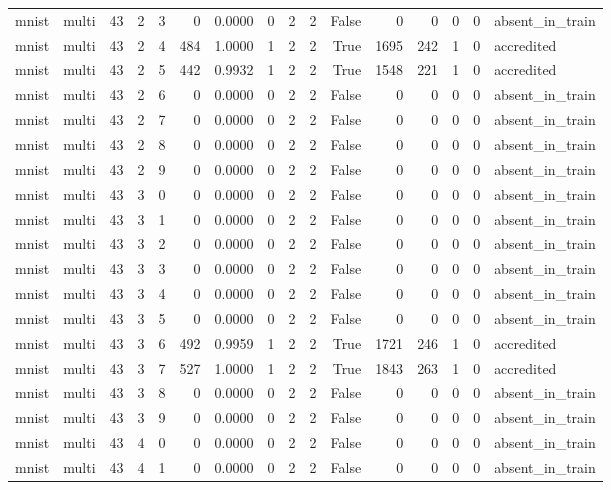\begin{tabular}{llrrrrrrrrrrrrrl}
mnist & multi & 43 & 2 & 3 & 0 & 0.0000 & 0 & 2 & 2 & False & 0 & 0 & 0 & 0 & absent\_in\_train \\
mnist & multi & 43 & 2 & 4 & 484 & 1.0000 & 1 & 2 & 2 & True & 1695 & 242 & 1 & 0 & accredited \\
mnist & multi & 43 & 2 & 5 & 442 & 0.9932 & 1 & 2 & 2 & True & 1548 & 221 & 1 & 0 & accredited \\
mnist & multi & 43 & 2 & 6 & 0 & 0.0000 & 0 & 2 & 2 & False & 0 & 0 & 0 & 0 & absent\_in\_train \\
mnist & multi & 43 & 2 & 7 & 0 & 0.0000 & 0 & 2 & 2 & False & 0 & 0 & 0 & 0 & absent\_in\_train \\
mnist & multi & 43 & 2 & 8 & 0 & 0.0000 & 0 & 2 & 2 & False & 0 & 0 & 0 & 0 & absent\_in\_train \\
mnist & multi & 43 & 2 & 9 & 0 & 0.0000 & 0 & 2 & 2 & False & 0 & 0 & 0 & 0 & absent\_in\_train \\
mnist & multi & 43 & 3 & 0 & 0 & 0.0000 & 0 & 2 & 2 & False & 0 & 0 & 0 & 0 & absent\_in\_train \\
mnist & multi & 43 & 3 & 1 & 0 & 0.0000 & 0 & 2 & 2 & False & 0 & 0 & 0 & 0 & absent\_in\_train \\
mnist & multi & 43 & 3 & 2 & 0 & 0.0000 & 0 & 2 & 2 & False & 0 & 0 & 0 & 0 & absent\_in\_train \\
mnist & multi & 43 & 3 & 3 & 0 & 0.0000 & 0 & 2 & 2 & False & 0 & 0 & 0 & 0 & absent\_in\_train \\
mnist & multi & 43 & 3 & 4 & 0 & 0.0000 & 0 & 2 & 2 & False & 0 & 0 & 0 & 0 & absent\_in\_train \\
mnist & multi & 43 & 3 & 5 & 0 & 0.0000 & 0 & 2 & 2 & False & 0 & 0 & 0 & 0 & absent\_in\_train \\
mnist & multi & 43 & 3 & 6 & 492 & 0.9959 & 1 & 2 & 2 & True & 1721 & 246 & 1 & 0 & accredited \\
mnist & multi & 43 & 3 & 7 & 527 & 1.0000 & 1 & 2 & 2 & True & 1843 & 263 & 1 & 0 & accredited \\
mnist & multi & 43 & 3 & 8 & 0 & 0.0000 & 0 & 2 & 2 & False & 0 & 0 & 0 & 0 & absent\_in\_train \\
mnist & multi & 43 & 3 & 9 & 0 & 0.0000 & 0 & 2 & 2 & False & 0 & 0 & 0 & 0 & absent\_in\_train \\
mnist & multi & 43 & 4 & 0 & 0 & 0.0000 & 0 & 2 & 2 & False & 0 & 0 & 0 & 0 & absent\_in\_train \\
mnist & multi & 43 & 4 & 1 & 0 & 0.0000 & 0 & 2 & 2 & False & 0 & 0 & 0 & 0 & absent\_in\_train \\

\end{tabular}
